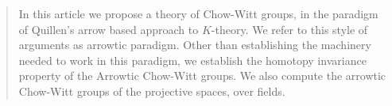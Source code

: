 \documentclass[12pt]{article}
\begin{document}
\def\CR{\mathcal{R}}

\def\CS{\mathcal{S}}
\def\CT{\mathcal{T}}
\def\CU{\mathcal{U}}
\def\CV{\mathcal{V}}
\def\CW{\mathcal{W}} 
\def\CX{\mathcal{X}}
\def\CY{\mathcal{Y}}
\def\CZ{\mathcal{Z}} 





\newcommand{\smallcirc}[1]{\scalebox{#1}{$\circ$}}

\def\BA{\mathbb{A}}
\def\BB{\mathbb{B}}
\def\BC{\mathbb{C}}
\def\BD{\mathbb{D}}
\def\BE{\mathbb{E}}
\def\BF{\mathbb{F}}
\def\BG{\mathbb{G}}
\def\BH{\mathbb{H}}
\def\BI{\mathbb{I}}
\def\BJ{\mathbb{J}}
\def\BK{\mathbb{K}}
\def\BL{\mathbb{L}}
\def\BM{\mathbb{M}}
\def\BN{\mathbb{N}} 
\def\BO{\mathbb{O}}
\def\BP{\mathbb{P}} 
\def\BQ{\mathbb{Q}}
\def\BR{\mathbb{R}}
\def\BS{\mathbb{S}}
\def\BT{\mathbb{T}}
\def\BU{\mathbb{U}}
\def\BV{\mathbb{V}}
\def\BW{\mathbb{W}}
\def\BX{\mathbb{X}}
\def\BY{\mathbb{Y}}
\def\BZ{\mathbb {Z}}



\def\SA{\mathscr {A}} 
\def\SB{\mathscr {B}}
\def\SC{\mathscr {C}}
\def\SD{\mathscr {D}}
\def\SE{\mathscr {E}}
\def\SF{\mathscr {F}}
\def\SG{\mathscr {G}}
\def\SH{\mathscr {H}}
\def\SI{\mathscr {I}}
\def\SJ{\mathscr {J}}
\def\SK{\mathscr {K}} 
\def\SL{\mathscr {L}} 
\def\SM{\mathscr {M}}
\def\SN{\mathscr {N}}
\def\SO{\mathscr {O}}
\def\SP{\mathscr {P}}
\def\SQ{\mathscr {Q}}
\def\SR{\mathscr {R}}
\def\SS{\mathscr {S}}
\def\ST{\mathscr {T}}
\def\SU{\mathscr {U}}
\def\SV{\mathscr {V}}
\def\SW{\mathscr {W}}
\def\SX{\mathscr {X}}
\def\SY{\mathscr {Y}}
\def\SZ{\mathscr {Z}} 
 
\def\bfA{\bf A}
\def\bfB{\bf B}
\def\bfC{\bf C}
\def\bfD{\bf D}
\def\bfE{\bf E}
\def\bfF{\bf F}
\def\bfG{\bf G}
\def\bfH{\bf H}
\def\bfK{\bf K}
\def\bfI{\bf I}
\def\bfJ{\bf J}
\def\bfK{\bf K}
\def\bfL{\bf L}
\def\bfM{\bf M}
\def\bfN{\bf N} 
\def\bfO{\bf O}
\def\bfP{\bf P} 
\def\bfQ{\bf Q}
\def\bfR{\bf R}
\def\bfS{\bf S}
\def\bfT{\bf T}
\def\bfU{\bf U}
\def\bfV{\bf V}
\def\bfW{\bf W}
\def\bfX{\bf X}
\def\bfY{\bf Y}
\def\bfZ{\bf Z}


 \def\bfw{\bf w}
 
\maketitle
\begin{abstract}
In this article we propose a theory of Chow-Witt groups, in the paradigm of Quillen's arrow based approach to $K$-theory. We refer to this style of arguments as arrowtic paradigm. Other than establishing the machinery needed to work in this paradigm, we establish the homotopy invariance property of the Arrowtic Chow-Witt groups. We also compute the arrowtic Chow-Witt groups of the projective spaces, over fields. 
\end{abstract}
\end{document}

